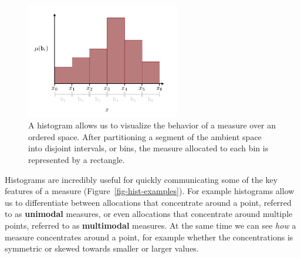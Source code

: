 \documentclass[
  letterpaper,
  DIV=11,
  numbers=noendperiod]{scrartcl}
\begin{document}
\begin{figure}

{\centering \includegraphics[width=0.6\textwidth,height=\textheight]{figures/histograms/histogram/histogram.pdf}

}

\caption{\label{fig-histogram-basics}A histogram allows us to visualize
the behavior of a measure over an ordered space. After partitioning a
segment of the ambient space into disjoint intervals, or bins, the
measure allocated to each bin is represented by a rectangle.}

\end{figure}

Histograms are incredibly useful for quickly communicating some of the
key features of a measure (Figure~\ref{fig-hist-examples}). For example
histograms allow us to differentiate between allocations that
concentrate around a point, referred to as \textbf{unimodal} measures,
or even allocations that concentrate around multiple points, referred to
as \textbf{multimodal} measures. At the same time we can see \emph{how}
a measure concentrates around a point, for example whether the
concentrations is symmetric or skewed towards smaller or larger values.
\end{document}
